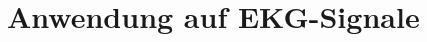 \documentclass[a4paper,11pt,bibliography=totoc,listof=totoc,headinclude=true,cleardoublepage=empty,oneside]{scrbook}
\theoremstyle{definition}
\theoremstyle{remark}
\begin{document}
%


\chapter{Anwendung auf EKG-Signale}
\end{document}
